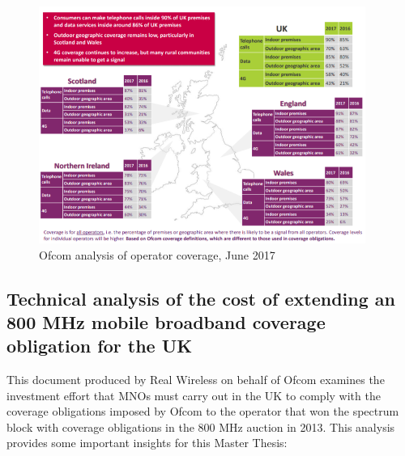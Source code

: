 \begin{figure}[H]
	\begin{Center}
		\includegraphics[width=0.95\textwidth]{./media/image7.png}
		\caption{Ofcom analysis of operator coverage, June 2017\cite{1-32}}
	\end{Center}
\end{figure}



\subsection*{Technical analysis of the cost of extending an 800 MHz mobile broadband coverage obligation for the UK}
This document produced by Real Wireless on behalf of Ofcom \cite{1-33} examines the investment effort that MNOs must carry out in the UK to comply with the coverage obligations imposed by Ofcom to the operator that won the spectrum block with coverage obligations in the 800 MHz auction in 2013. This analysis provides some important insights for this Master Thesis:\par

